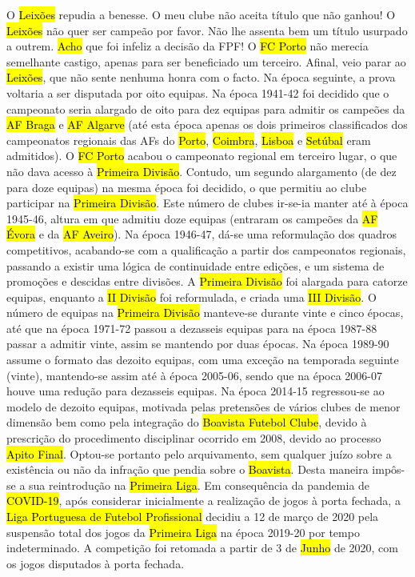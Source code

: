 \documentclass[a4paper,12pt]{article}
\begin{document}
O \hl{Leixões} repudia a benesse. O meu clube não aceita título que não ganhou! O \hl{Leixões} não quer ser campeão por favor. Não lhe assenta bem um título usurpado a outrem. \hl{Acho} que foi infeliz a decisão da FPF! O \hl{FC Porto} não merecia semelhante castigo, apenas para ser beneficiado um terceiro. Afinal, veio parar ao \hl{Leixões}, que não sente nenhuma honra com o facto.
Na época seguinte, a prova voltaria a ser disputada por oito equipas. Na época 1941-42 foi decidido que o campeonato seria alargado de oito para dez equipas para admitir os campeões da \hl{AF Braga} e \hl{AF Algarve} (até esta época apenas os dois primeiros classificados dos campeonatos regionais das AFs do \hl{Porto}, \hl{Coimbra}, \hl{Lisboa} e \hl{Setúbal} eram admitidos). O \hl{FC Porto} acabou o campeonato regional em terceiro lugar, o que não dava acesso à \hl{Primeira Divisão}. Contudo, um segundo alargamento (de dez para doze equipas) na mesma época foi decidido, o que permitiu ao clube participar na \hl{Primeira Divisão}. Este número de clubes ir-se-ia manter até à época 1945-46, altura em que admitiu doze equipas (entraram os campeões da \hl{AF Évora} e da \hl{AF Aveiro}).
Na época 1946-47, dá-se uma reformulação dos quadros competitivos, acabando-se com a qualificação a partir dos campeonatos regionais, passando a existir uma lógica de continuidade entre edições, e um sistema de promoções e descidas entre divisões. A \hl{Primeira Divisão} foi alargada para catorze equipas, enquanto a \hl{II Divisão} foi reformulada, e criada uma \hl{III Divisão}.
O número de equipas na \hl{Primeira Divisão} manteve-se durante vinte e cinco épocas, até que na época 1971-72 passou a dezasseis equipas para na época 1987-88 passar a admitir vinte, assim se mantendo por duas épocas. Na época 1989-90 assume o formato das dezoito equipas, com uma exceção na temporada seguinte (vinte), mantendo-se assim até à época 2005-06, sendo que na época 2006-07 houve uma redução para dezasseis equipas.
Na época 2014-15 regressou-se ao modelo de dezoito equipas, motivada pelas pretensões de vários clubes de menor dimensão bem como pela integração do \hl{Boavista Futebol Clube}, devido à prescrição do procedimento disciplinar ocorrido em 2008, devido ao processo \hl{Apito Final}. Optou-se portanto pelo arquivamento, sem qualquer juízo sobre a existência ou não da infração que pendia sobre o \hl{Boavista}. Desta maneira impôs-se a sua reintrodução na \hl{Primeira Liga}.
Em consequência da pandemia de \hl{COVID-19}, após considerar inicialmente a realização de jogos à porta fechada, a \hl{Liga Portuguesa de Futebol Profissional} decidiu a 12 de março de 2020 pela suspensão total dos jogos da \hl{Primeira Liga} na época 2019-20 por tempo indeterminado. A competição foi retomada a partir de 3 de \hl{Junho} de 2020, com os jogos disputados à porta fechada.
\end{document}

